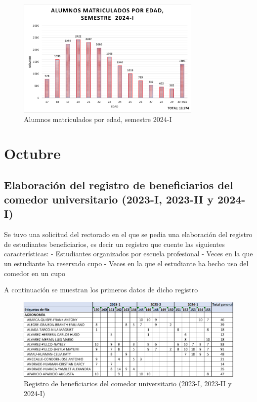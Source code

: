 \documentclass[
  12pt,
  letterpaper,
]{scrreprt}
\begin{document}
\begin{figure}[H]

\caption{Alumnos matriculados por edad, semestre 2024-I}

{\centering \includegraphics[width=0.8\textwidth,height=\textheight]{imagen/imagen9.png}

}

\end{figure}%

\section{Octubre}\label{octubre}

\subsection{Elaboración del registro de beneficiarios del comedor
universitario (2023-I, 2023-II y
2024-I)}\label{elaboraciuxf3n-del-registro-de-beneficiarios-del-comedor-universitario-2023-i-2023-ii-y-2024-i}

Se tuvo una solicitud del rectorado en el que se pedia una elaboración
del registro de estudiantes beneficiarios, es decir un registro que
cuente las siguientes características: - Estudiantes organizados por
escuela profesional - Veces en la que un estudiante ha reservado cupo -
Veces en la que el estudiante ha hecho uso del comedor en un cupo

A continuación se muestran los primeros datos de dicho registro

\begin{figure}[H]

\caption{Registro de beneficiarios del comedor universitario (2023-I,
2023-II y 2024-I)}

{\centering \includegraphics{imagen/cuadro1.png}

}

\end{figure}%
\end{document}
